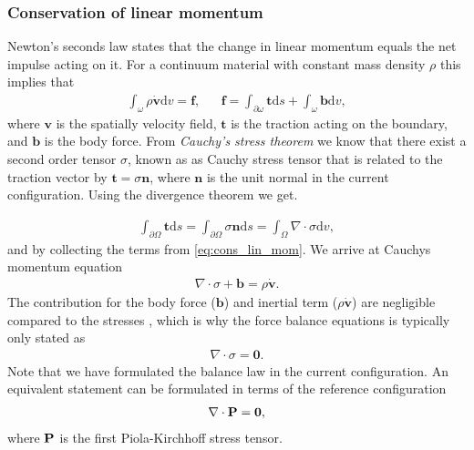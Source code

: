 \subsubsection{Conservation of linear momentum}
Newton's seconds law states that the change in linear momentum equals
the net impulse acting on it. For a continuum material with constant
mass density $\rho$ this implies that
\begin{align}
  \int_{\omega} \rho \dot{\mathbf{v}} \mathrm{d}v = \mathbf{f},
  && \mathbf{f} = \int_{\partial \omega} \mathbf{t} \mathrm{d}s
     + \int_{\omega} \mathbf{b} \mathrm{d}v,
     \label{eq:cons_lin_mom}
\end{align}
where $\mathbf{v}$ is the spatially velocity field, $\mathbf{t}$ is
the traction acting on the boundary, and $\mathbf{b}$ is the body
force. From \emph{Cauchy's stress theorem} we know that there exist a
second order tensor $\sigma$, known as as Cauchy stress tensor that is
related to the traction vector by $\mathbf{t} = \sigma \mathbf{n}$,
where $\mathbf{n}$ is the unit normal in the current configuration.
Using the divergence theorem we get.

\begin{align*}
  \int_{\partial \Omega} \mathbf{t} \mathrm{d}s
  = \int_{\partial \Omega} \sigma \mathbf{n} \mathrm{d}s
  = \int_{\Omega} \nabla \cdot \sigma \mathrm{d}v,
\end{align*}
and by collecting the terms from \eqref{eq:cons_lin_mom}. We arrive at
Cauchys momentum equation
\begin{align}
  \nabla \cdot \sigma + \mathbf{b} =  \rho \dot{\mathbf{v}}.
  \label{eq:chauch_momentum_eq}
\end{align}
The contribution for the body force ($\mathbf{b}$)  and inertial term
($\rho \dot{\mathbf{v}}$) are negligible compared to the stresses
\cite{hunter1996kd,tallarida1970left, moskowitz1981effects}, which is
why the force balance equations is typically only stated as
\begin{align}
  \nabla \cdot \sigma = \mathbf{0}.
  \label{eq:momentum_simple_current}
\end{align}
Note that we have formulated the balance law in the current
configuration. An equivalent statement can be formulated in terms of
the reference configuration
\begin{align}
  \nabla \cdot \mathbf{P} = \mathbf{0}, 
  \label{eq:momentum_simple_reference}
\end{align}
where $\mathbf{P}$ is the first Piola-Kirchhoff stress tensor.

